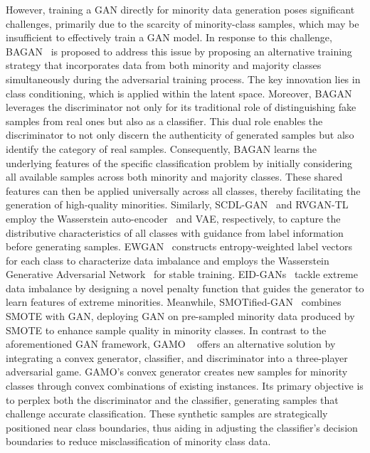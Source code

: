 However, training a GAN directly for minority data generation poses significant challenges, primarily due to the scarcity of minority-class samples, which may be insufficient to effectively train a GAN model. In response to this challenge, BAGAN~\cite{mariani2018bagan} is proposed to address this issue by proposing an alternative training strategy that incorporates data from both minority and majority classes simultaneously during the adversarial training process. The key innovation lies in class conditioning, which is applied within the latent space. Moreover, BAGAN leverages the discriminator not only for its traditional role of distinguishing fake samples from real ones but also as a classifier. This dual role enables the discriminator to not only discern the authenticity of generated samples but also identify the category of real samples. Consequently, BAGAN learns the underlying features of the specific classification problem by initially considering all available samples across both minority and majority classes. These shared features can then be applied universally across all classes, thereby facilitating the generation of high-quality minorities. Similarly, SCDL-GAN~\cite{cai2019supervised} and RVGAN-TL~\cite{ding2023rvgan} employ the Wasserstein auto-encoder~\cite{tolstikhin2017wasserstein} and VAE, respectively, to capture the distributive characteristics of all classes with guidance from label information before generating samples. EWGAN~\cite{ren2019ewgan} constructs entropy-weighted label vectors for each class to characterize data imbalance and employs the Wasserstein Generative Adversarial Network~\cite{arjovsky2017wasserstein} for stable training. EID-GANs~\cite{li2022eid} tackle extreme data imbalance by designing a novel penalty function that guides the generator to learn features of extreme minorities. Meanwhile, SMOTified-GAN~\cite{sharma2022smotified} combines SMOTE with GAN, deploying GAN on pre-sampled minority data produced by SMOTE to enhance sample quality in minority classes. In contrast to the aforementioned GAN framework, GAMO ~\cite{mullick2019generative} offers an alternative solution by integrating a convex generator, classifier, and discriminator into a three-player adversarial game. GAMO's convex generator creates new samples for minority classes through convex combinations of existing instances. Its primary objective is to perplex both the discriminator and the classifier, generating samples that challenge accurate classification. These synthetic samples are strategically positioned near class boundaries, thus aiding in adjusting the classifier's decision boundaries to reduce misclassification of minority class data.

